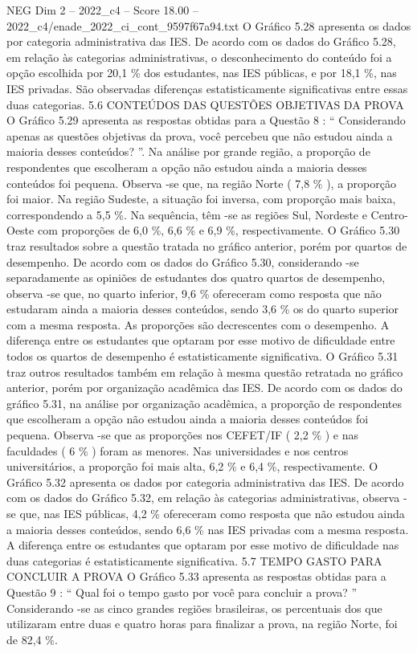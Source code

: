 \begin{textsample}{NEG Dim 2 – 2022\_c4 – Score 18.00 – 2022\_c4/enade\_2022\_ci\_cont\_9597f67a94.txt}
O Gráfico 5.28 apresenta os dados por categoria administrativa das IES.
De acordo com os dados do Gráfico 5.28, em relação às categorias administrativas, o desconhecimento do conteúdo foi a opção escolhida por 20,1 \% dos estudantes, nas IES públicas, e por 18,1 \%, nas IES privadas.
São observadas diferenças estatisticamente significativas entre essas duas categorias. 5.6 CONTEÚDOS DAS QUESTÕES OBJETIVAS DA PROVA O Gráfico 5.29 apresenta as respostas obtidas para a Questão 8 : “ Considerando apenas as questões objetivas da prova, você percebeu que não estudou ainda a maioria desses conteúdos? ”.
Na análise por grande região, a proporção de respondentes que escolheram a opção não estudou ainda a maioria desses conteúdos foi pequena.
Observa -se que, na região Norte ( 7,8 \% ), a proporção foi maior.
Na região Sudeste, a situação foi inversa, com proporção mais baixa, correspondendo a 5,5 \%.
Na sequência, têm -se as regiões Sul, Nordeste e Centro-Oeste com proporções de 6,0 \%, 6,6 \% e 6,9 \%, respectivamente.
O Gráfico 5.30 traz resultados sobre a questão tratada no gráfico anterior, porém por quartos de desempenho.
De acordo com os dados do Gráfico 5.30, considerando -se separadamente as opiniões de estudantes dos quatro quartos de desempenho, observa -se que, no quarto inferior, 9,6 \% ofereceram como resposta que não estudaram ainda a maioria desses conteúdos, sendo 3,6 \% os do quarto superior com a mesma resposta.
As proporções são decrescentes com o desempenho.
A diferença entre os estudantes que optaram por esse motivo de dificuldade entre todos os quartos de desempenho é estatisticamente significativa.
O Gráfico 5.31 traz outros resultados também em relação à mesma questão retratada no gráfico anterior, porém por organização acadêmica das IES.
De acordo com os dados do gráfico 5.31, na análise por organização acadêmica, a proporção de respondentes que escolheram a opção não estudou ainda a maioria desses conteúdos foi pequena.
Observa -se que as proporções nos CEFET/IF ( 2,2 \% ) e nas faculdades ( 6 \% ) foram as menores.
Nas universidades e nos centros universitários, a proporção foi mais alta, 6,2 \% e 6,4 \%, respectivamente.
O Gráfico 5.32 apresenta os dados por categoria administrativa das IES.
De acordo com os dados do Gráfico 5.32, em relação às categorias administrativas, observa -se que, nas IES públicas, 4,2 \% ofereceram como resposta que não estudou ainda a maioria desses conteúdos, sendo 6,6 \% nas IES privadas com a mesma resposta.
A diferença entre os estudantes que optaram por esse motivo de dificuldade nas duas categorias é estatisticamente significativa. 5.7 TEMPO GASTO PARA CONCLUIR A PROVA O Gráfico 5.33 apresenta as respostas obtidas para a Questão 9 : “ Qual foi o tempo gasto por você para concluir a prova? ” Considerando -se as cinco grandes regiões brasileiras, os percentuais dos que utilizaram entre duas e quatro horas para finalizar a prova, na região Norte, foi de 82,4 \%.

\end{textsample}
